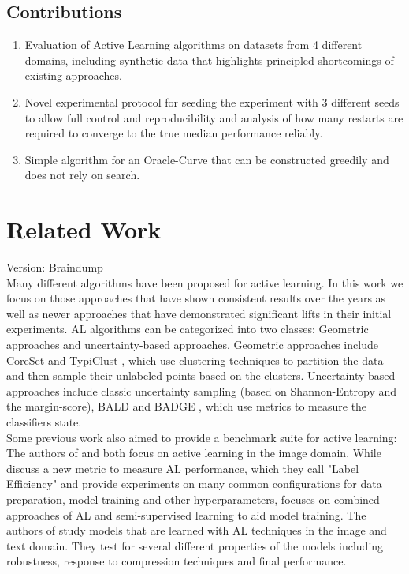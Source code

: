 \documentclass[]{article}
\begin{document}
\subsection{Contributions}
\begin{enumerate}
	\item Evaluation of Active Learning algorithms on datasets from 4 different domains, including synthetic data that highlights principled shortcomings of existing approaches.
	\item Novel experimental protocol for seeding the experiment with 3 different seeds to allow full control and reproducibility and analysis of how many restarts are required to converge to the true median performance reliably.
	\item Simple algorithm for an Oracle-Curve that can be constructed greedily and does not rely on search.
\end{enumerate}

\section{Related Work}
{\color{red} Version: Braindump}\\
Many different algorithms have been proposed for active learning. 
In this work we focus on those approaches that have shown consistent results over the years as well as newer approaches that have demonstrated significant lifts in their initial experiments.
AL algorithms can be categorized into two classes: Geometric approaches and uncertainty-based approaches.
Geometric approaches include CoreSet \cite{sener2017active} and TypiClust \cite{hacohen2022active}, which use clustering techniques to partition the data and then sample their unlabeled points based on the clusters.
Uncertainty-based approaches include classic uncertainty sampling (based on Shannon-Entropy and the margin-score), BALD \cite{kirsch2019batchbald} and BADGE \cite{ashdeep}, which use metrics to measure the classifiers state. \\ [1mm]
%
Some previous work also aimed to provide a benchmark suite for active learning:
The authors of \cite{beck2021effective} and \cite{li2022empirical} both focus on active learning in the image domain.
While \cite{beck2021effective} discuss a new metric to measure AL performance, which they call "Label Efficiency" and provide experiments on many common configurations for data preparation, model training and other hyperparameters, \cite{li2022empirical} focuses on combined approaches of AL and semi-supervised learning to aid model training.
The authors of \cite{hu2021towards} study models that are learned with AL techniques in the image and text domain.
They test for several different properties of the models including robustness, response to compression techniques and final performance.
\end{document}
